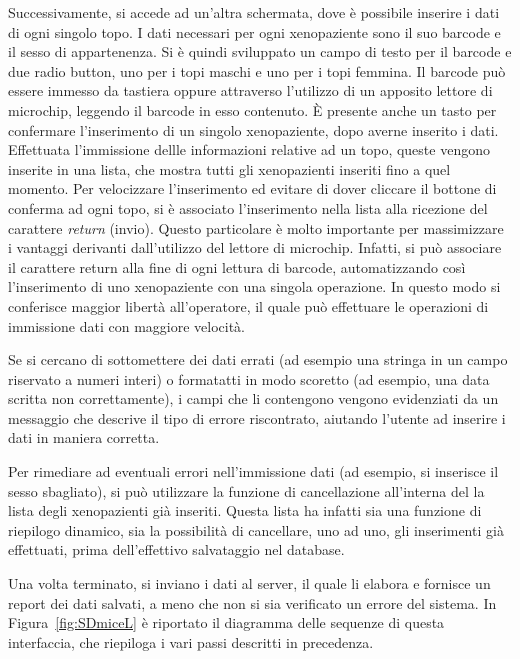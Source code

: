 Successivamente, si accede ad un'altra schermata, dove \`e possibile inserire i dati di ogni singolo topo. I dati necessari per ogni xenopaziente sono il suo barcode e il sesso di appartenenza. Si \`e quindi sviluppato un campo di testo per il barcode e due radio button, uno per i topi maschi e uno per i topi femmina. Il barcode pu\`o essere immesso da tastiera oppure attraverso l'utilizzo di un apposito lettore di microchip, leggendo il barcode in esso contenuto. \`E presente anche un tasto per confermare l'inserimento di un singolo xenopaziente, dopo averne inserito i dati. Effettuata l'immissione dellle informazioni relative ad un topo, queste vengono inserite in una lista, che mostra tutti gli xenopazienti inseriti fino a quel momento. Per velocizzare l'inserimento ed evitare di dover cliccare il bottone di conferma ad ogni topo, si \`e associato l'inserimento nella lista alla ricezione del carattere \textit{return} (invio). Questo particolare \`e molto importante per massimizzare i vantaggi derivanti dall'utilizzo del lettore di microchip. Infatti, si pu\`o associare il carattere return alla fine di ogni lettura di barcode, automatizzando cos\`i l'inserimento di uno xenopaziente con una singola operazione. In questo modo si conferisce maggior libert\`a all'operatore, il quale pu\`o effettuare le operazioni di immissione dati con maggiore velocit\`a.

Se si cercano di sottomettere dei dati errati (ad esempio una stringa in un campo riservato a numeri interi) o formatatti in modo scoretto (ad esempio, una data scritta non correttamente), i campi che li contengono vengono evidenziati da un messaggio che descrive il tipo di errore riscontrato, aiutando l'utente ad inserire i dati in maniera corretta.

Per rimediare ad eventuali errori nell'immissione dati (ad esempio, si inserisce il sesso sbagliato), si pu\`o utilizzare la funzione di cancellazione all'interna del la lista degli xenopazienti gi\`a inseriti. Questa lista ha infatti sia una funzione di riepilogo dinamico, sia la possibilit\`a di cancellare, uno ad uno, gli inserimenti gi\`a effettuati, prima dell'effettivo salvataggio nel database.

Una volta terminato, si inviano i dati al server, il quale li elabora e fornisce un report dei dati salvati, a meno che non si sia verificato un errore del sistema. In Figura~\ref{fig:SDmiceL} \`e riportato il diagramma delle sequenze di questa interfaccia, che riepiloga i vari passi descritti in precedenza.

